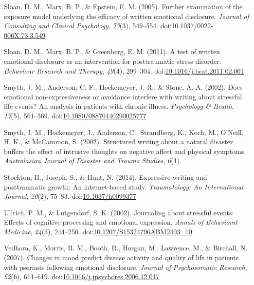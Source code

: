 \documentclass[english,man]{apa6}
\theoremstyle{definition}
\theoremstyle{definition}
\theoremstyle{definition}
\theoremstyle{remark}
\begin{document}
\hypertarget{ref-Sloan2005}{}
Sloan, D. M., Marx, B. P., \& Epstein, E. M. (2005). Further examination
of the exposure model underlying the efficacy of written emotional
disclosure. \emph{Journal of Consulting and Clinical Psychology},
\emph{73}(3), 549--554.
doi:\href{https://doi.org/10.1037/0022-006X.73.3.549}{10.1037/0022-006X.73.3.549}

\hypertarget{ref-Sloan2011a}{}
Sloan, D. M., Marx, B. P., \& Greenberg, E. M. (2011). A test of written
emotional disclosure as an intervention for posttraumatic stress
disorder. \emph{Behaviour Research and Therapy}, \emph{49}(4), 299--304.
doi:\href{https://doi.org/10.1016/j.brat.2011.02.001}{10.1016/j.brat.2011.02.001}

\hypertarget{ref-Smyth2002a}{}
Smyth, J. M., Anderson, C. F., Hockemeyer, J. R., \& Stone, A. A.
(2002). Does emotional non-expressiveness or avoidance interfere with
writing about stressful life events? An analysis in patients with
chronic illness. \emph{Psychology \& Health}, \emph{17}(5), 561--569.
doi:\href{https://doi.org/10.1080/08870440290025777}{10.1080/08870440290025777}

\hypertarget{ref-Smyth2002}{}
Smyth, J. M., Hockemeyer, J., Anderson, C., Strandberg, K., Koch, M.,
O'Neill, H. K., \& McCammon, S. (2002). Structured writing about a
natural disaster buffers the effect of intrusive thoughts on negative
affect and physical symptoms. \emph{Australasian Journal of Disaster and
Trauma Studies}, \emph{6}(1).

\hypertarget{ref-Stockton2014}{}
Stockton, H., Joseph, S., \& Hunt, N. (2014). Expressive writing and
posttraumatic growth: An internet-based study. \emph{Traumatology: An
International Journal}, \emph{20}(2), 75--83.
doi:\href{https://doi.org/10.1037/h0099377}{10.1037/h0099377}

\hypertarget{ref-Ullrich2002a}{}
Ullrich, P. M., \& Lutgendorf, S. K. (2002). Journaling about stressful
events: Effects of cognitive processing and emotional expression.
\emph{Annals of Behavioral Medicine}, \emph{24}(3), 244--250.
doi:\href{https://doi.org/10.1207/S15324796ABM2403_10}{10.1207/S15324796ABM2403\_10}

\hypertarget{ref-Vedhara2007}{}
Vedhara, K., Morris, R. M., Booth, R., Horgan, M., Lawrence, M., \&
Birchall, N. (2007). Changes in mood predict disease activity and
quality of life in patients with psoriasis following emotional
disclosure. \emph{Journal of Psychosomatic Research}, \emph{62}(6),
611--619.
doi:\href{https://doi.org/10.1016/j.jpsychores.2006.12.017}{10.1016/j.jpsychores.2006.12.017}
\end{document}
